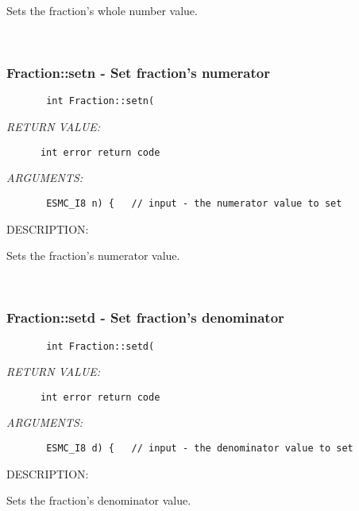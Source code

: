        Sets the fraction's whole number value.
   
 
\mbox{}\hrulefill\ 
 
\subsubsection [Fraction::setn] {Fraction::setn - Set fraction's numerator}


  
\begin{verbatim}       int Fraction::setn(\end{verbatim}{\em RETURN VALUE:}
\begin{verbatim}      int error return code\end{verbatim}{\em ARGUMENTS:}
\begin{verbatim}       ESMC_I8 n) {   // input - the numerator value to set\end{verbatim}
{\sf DESCRIPTION:\\ }


       Sets the fraction's numerator value.
   
 
\mbox{}\hrulefill\ 
 
\subsubsection [Fraction::setd] {Fraction::setd - Set fraction's denominator}


  
\begin{verbatim}       int Fraction::setd(\end{verbatim}{\em RETURN VALUE:}
\begin{verbatim}      int error return code\end{verbatim}{\em ARGUMENTS:}
\begin{verbatim}       ESMC_I8 d) {   // input - the denominator value to set\end{verbatim}
{\sf DESCRIPTION:\\ }


       Sets the fraction's denominator value.
   
 
\mbox{}\hrulefill\ 
 

